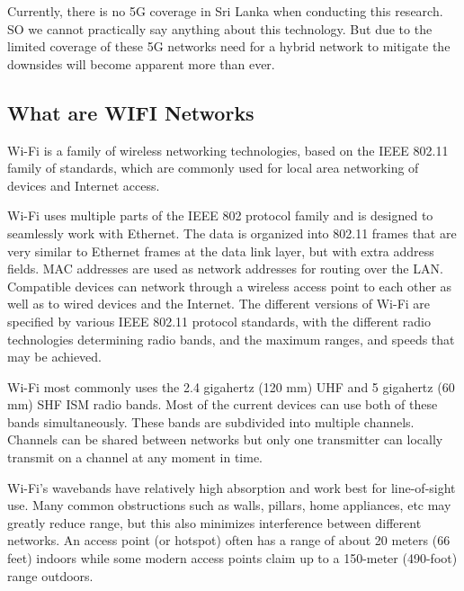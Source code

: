 \vspace{12pt}

Currently, there is no 5G coverage in Sri Lanka when conducting this research. SO we cannot practically say anything about this technology. But due to the limited coverage of these 5G networks need for a hybrid network to mitigate the downsides will become apparent more than ever.

\vspace{12pt}
\clearpage
\subsection{What are WIFI Networks}


\vspace{12pt}

Wi-Fi is a family of wireless networking technologies, based on the IEEE 802.11 family of standards, which are commonly used for local area networking of devices and Internet access. 

\vspace{12pt}

Wi-Fi uses multiple parts of the IEEE 802 protocol family and is designed to seamlessly work with Ethernet. The data is organized into 802.11 frames that are very similar to Ethernet frames at the data link layer, but with extra address fields. MAC addresses are used as network addresses for routing over the LAN. Compatible devices can network through a wireless access point to each other as well as to wired devices and the Internet. The different versions of Wi-Fi are specified by various IEEE 802.11 protocol standards, with the different radio technologies determining radio bands, and the maximum ranges, and speeds that may be achieved. 


\vspace{12pt}


Wi-Fi most commonly uses the 2.4 gigahertz (120 mm) UHF and 5 gigahertz (60 mm) SHF ISM radio bands. Most of the current devices can use both of these bands simultaneously. These bands are subdivided into multiple channels. Channels can be shared between networks but only one transmitter can locally transmit on a channel at any moment in time.


\vspace{12pt}


Wi-Fi's wavebands have relatively high absorption and work best for line-of-sight use. Many common obstructions such as walls, pillars, home appliances, etc may greatly reduce range, but this also minimizes interference between different networks. An access point (or hotspot) often has a range of about 20 meters (66 feet) indoors while some modern access points claim up to a 150-meter (490-foot) range outdoors. 

